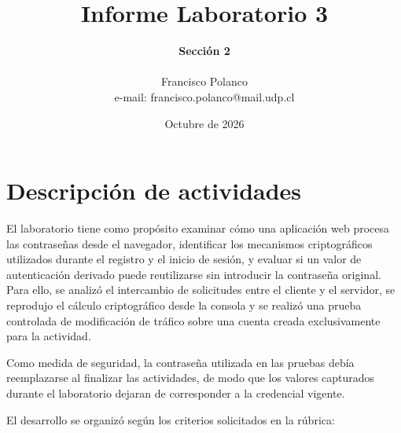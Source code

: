 \documentclass[letter,12pt]{article}
\newcommand{\sangria}{\hspace*{1.25cm}} %
\begin{document}
\renewcommand{\figurename}{Figura}
\renewcommand{\contentsname}{Índice}
\renewcommand{\tablename}{Tabla}


   \title{\Huge{Informe Laboratorio 3}}

   \author{\textbf{Sección 2} \\  \\ Francisco Polanco \\ e-mail: francisco.polanco@mail.udp.cl}

   \date{Octubre de 2026}

   \maketitle

   \tableofcontents

  \newpage


\section{Descripción de actividades}
\label{sec:enunciado}
\sangria El laboratorio tiene como propósito examinar cómo una aplicación web procesa las contraseñas desde el navegador, identificar los mecanismos criptográficos utilizados durante el registro y el inicio de sesión, y evaluar si un valor de autenticación derivado puede reutilizarse sin introducir la contraseña original. Para ello, se analizó el intercambio de solicitudes entre el cliente y el servidor, se reprodujo el cálculo criptográfico desde la consola y se realizó una prueba controlada de modificación de tráfico sobre una cuenta creada exclusivamente para la actividad.\par

Como medida de seguridad, la contraseña utilizada en las pruebas debía reemplazarse al finalizar las actividades, de modo que los valores capturados durante el laboratorio dejaran de corresponder a la credencial vigente.\par

El desarrollo se organizó según los criterios solicitados en la rúbrica:
\end{document}
